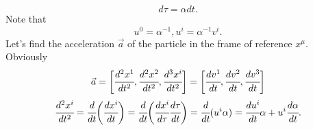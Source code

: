 \documentclass[main.tex]{subfiles}
\begin{document}
\begin{equation}
\boxed{
d\tau = \alpha dt.}
\end{equation}
Note that
\begin{equation}
\label{velocity-4-velocity}
u^0 = \alpha^{-1}, u^i = \alpha^{-1}v^i.
\end{equation}
Let's find the acceleration $\vec{a}$ of the particle in the frame of reference $x^\mu$.
Obviously
\begin{equation}
\vec{a} = \bigg[\cfrac{d^2 x^1}{dt^2}, \cfrac{d^2 x^2}{dt^2}, \cfrac{d^3 x^i}{dt^2}\bigg] = \bigg[\cfrac{dv^1}{dt},\cfrac{dv^2}{dt}, \cfrac{dv^3}{dt}\bigg]
\end{equation}
\begin{multline}
\label{acceleration-start}
\cfrac{d^2 x^i}{dt^2} = \cfrac{d}{dt}\bigg(\cfrac{dx^i}{dt}\bigg) = \cfrac{d}{dt}\bigg(\cfrac{dx^i}{d\tau}\cfrac{d\tau}{dt}\bigg) = \cfrac{d}{dt}(u^i\alpha) = \cfrac{du^i}{dt}\alpha + u^i\cfrac{d\alpha}{dt}.
\end{multline}
\end{document}
